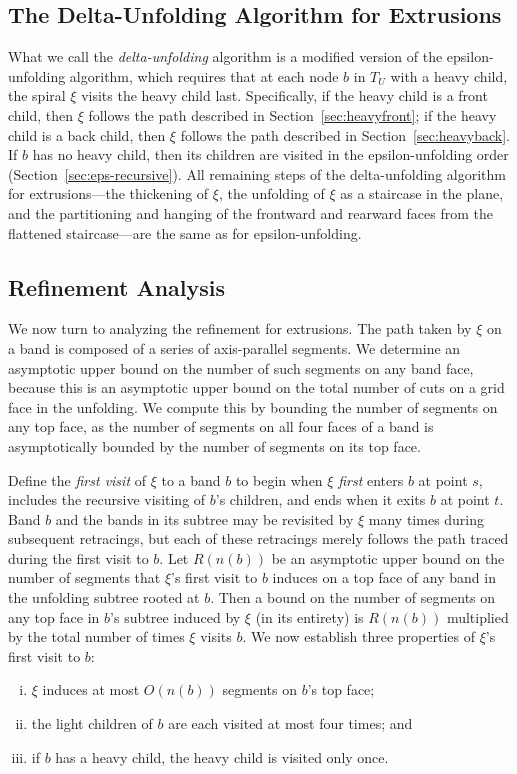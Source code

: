 \documentclass[11pt]{article}
\begin{document}
\subsection{The Delta-Unfolding Algorithm for Extrusions}
\label{sec:analysis}

What we call the {\em delta-unfolding} algorithm is
a modified version of the epsilon-unfolding algorithm, which requires that at each node $b$ in $T_U$
with a heavy child, the spiral $\xi$ visits the heavy child last.
Specifically, if the heavy child is a front child, then $\xi$ follows the
path described in Section~\ref{sec:heavyfront}; if the heavy child is a back child, then $\xi$ follows the
path described in Section~\ref{sec:heavyback}.
If $b$ has no heavy child, then its children are visited in the
epsilon-unfolding order (Section~\ref{sec:eps-recursive}).
All remaining steps of the delta-unfolding algorithm for extrusions---the
thickening of $\xi$, the unfolding of $\xi$ as a staircase in the plane,
and the partitioning and hanging of the frontward and rearward faces from the
flattened staircase---are the same as for epsilon-unfolding.

\subsection{Refinement Analysis}

We now turn to analyzing the refinement for extrusions. The path taken by $\xi$
on a band is composed of a series of
axis-parallel segments.
We determine an asymptotic upper bound on the number
of such segments on any band face,
because this is an asymptotic upper bound on the total
number of cuts on a grid face in the unfolding. We compute this by bounding the number
of segments on any top face, as the number of segments on all four faces of a
band is asymptotically bounded by the number of segments on its top face.

Define the {\em first visit} of $\xi$ to a band $b$ to begin
when $\xi$ {\em first} enters $b$ at point $s$, includes the recursive visiting of
$b$'s children, and ends when it exits $b$ at point $t$.
Band
$b$ and the bands in its subtree may be revisited by $\xi$ many times during
subsequent retracings, but each of these retracings merely follows the path traced
during the first visit to $b$.
Let $R(n(b))$ be an asymptotic upper bound on the number of segments that
$\xi$'s first visit to $b$
induces on a top face of any band in the unfolding subtree rooted at $b$.
Then a bound on the number of
 segments on any top face in $b$'s subtree induced by $\xi$ (in its entirety) is $R(n(b))$
multiplied by the total number of times $\xi$ visits $b$.
We now establish three properties of $\xi$'s first visit to $b$:
\begin{enumerate}[(i)]
\item $\xi$ induces at most $O(n(b))$  segments on $b$'s top face;
\item the light children of $b$ are each visited at most four times; and
\item if $b$ has a heavy child, the heavy child is visited only once.
\end{enumerate}
\end{document}
